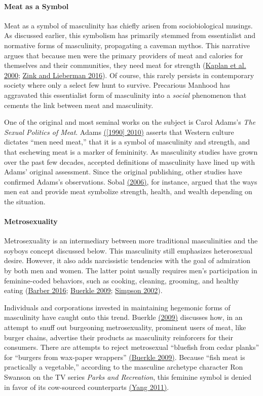 \documentclass[twoside]{report}
\begin{document}
\paragraph{Meat as a Symbol}

Meat as a symbol of masculinity has chiefly arisen from sociobiological
musings. As discussed earlier, this symbolism has primarily stemmed from essentialist and normative forms of masculinity, propagating a caveman mythos. This narrative argues that because men were the primary providers of meat and calories for themselves and their communities, they need meat for strength (\hyperlink{kaplan}{Kaplan et al. 2000}; \hyperlink{zink}{Zink and Lieberman 2016}). Of course, this rarely persists in contemporary society where only a select few hunt to survive. Precarious Manhood has aggravated this essentialist form of masculinity into a \textit{social} phenomenon that cements the link between meat and masculinity.

One of the original and most seminal works on the subject is Carol Adams's \emph{The Sexual Politics of Meat}. Adams \hyperlink{adams}{([1990] 2010)} asserts that Western culture dictates ``men need meat,'' that it is a symbol of masculinity and strength, and that eschewing meat is a marker of femininity. As masculinity studies have grown over the past few decades, accepted definitions of masculinity have lined up with Adams' original assessment. Since the original publishing, other studies have confirmed Adams's observations. Sobal \hyperlink{sobal}{(2006)}, for instance, argued that the ways men eat and provide meat symbolize strength, health, and wealth depending on the situation.

\paragraph{Metrosexuality}
Metrosexuality is an intermediary between more traditional masculinities
and the soyboys concept discussed below. This masculinity still
emphasizes heterosexual desire. However, it also adds narcissistic
tendencies with the goal of admiration by both men and women. The latter
point usually requires men's participation in feminine-coded behaviors,
such as cooking, cleaning, grooming, and healthy eating (\hyperlink{barber1}{Barber 2016}; \hyperlink{buerkle}{Buerkle 2009}; \hyperlink{simpson}{Simpson 2002}).


Individuals and corporations invested in maintaining hegemonic forms of
masculinity have caught onto this trend. Buerkle \hyperlink{buerkle}{(2009)} discusses how, in an attempt to snuff out burgeoning metrosexuality, prominent users of meat, like burger chains, advertise their products as masculinity
reinforcers for their consumers. There are attempts to reject
metrosexual ``bluefish from cedar planks'' for ``burgers from wax-paper
wrappers'' \hyperlink{buerkle}{(Buerkle 2009)}. Because ``fish meat is practically a vegetable,'' according to the masculine archetype character Ron Swanson on the TV series \emph{Parks and Recreation}, this feminine symbol is denied in favor of
its cow-sourced counterparts \hyperlink{yang}{(Yang 2011)}.
\end{document}
